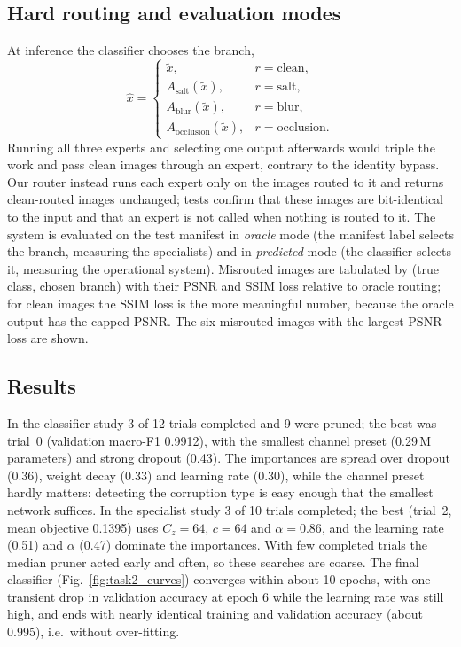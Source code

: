 \documentclass[conference]{IEEEtran}
\begin{document}
\subsection{Hard routing and evaluation modes}
At inference the classifier chooses the branch,
\begin{equation}
\hat{x} =
\begin{cases}
\tilde{x}, & r=\text{clean},\\
A_{\mathrm{salt}}(\tilde{x}), & r=\text{salt},\\
A_{\mathrm{blur}}(\tilde{x}), & r=\text{blur},\\
A_{\mathrm{occlusion}}(\tilde{x}), & r=\text{occlusion}.
\end{cases}
\label{eq:hard_routing}
\end{equation}
Running all three experts and selecting one output afterwards would triple
the work and pass clean images through an expert, contrary to the identity
bypass. Our router instead runs each expert only on the images routed to it
and returns clean-routed images unchanged; tests confirm that these images
are bit-identical to the input and that an expert is not called when nothing
is routed to it. The system is evaluated on the test manifest in
\emph{oracle} mode (the manifest label selects the branch, measuring the
specialists) and in \emph{predicted} mode (the classifier selects it,
measuring the operational system). Misrouted images are tabulated by (true
class, chosen branch) with their PSNR and SSIM loss relative to oracle
routing; for clean images the SSIM loss is the more meaningful number,
because the oracle output has the capped PSNR. The six misrouted images with
the largest PSNR loss are shown.

\subsection{Results}
In the classifier study 3 of 12 trials completed and 9 were pruned; the
best was trial~0 (validation macro-F1 0.9912), with the smallest channel
preset (0.29\,M parameters) and strong dropout (0.43). The importances are
spread over dropout (0.36), weight decay (0.33) and learning rate (0.30),
while the channel preset hardly matters: detecting the corruption type is
easy enough that the smallest network suffices. In the specialist study 3 of
10 trials completed; the best (trial~2, mean objective 0.1395) uses
$C_z=64$, $c=64$ and $\alpha=0.86$, and the learning rate (0.51) and $\alpha$
(0.47) dominate the importances. With few completed trials the median pruner
acted early and often, so these searches are coarse. The final classifier
(Fig.~\ref{fig:task2_curves}) converges within about 10 epochs, with one
transient drop in validation accuracy at epoch 6 while the learning rate was
still high, and ends with nearly identical training and validation
accuracy (about 0.995), i.e.\ without over-fitting.
\end{document}
